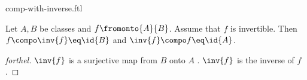\documentclass{stex}
\begin{document}
\begin{smodule}{comp-with-inverse.ftl}


\begin{proposition}[forthel,id=InvIsInvOfComp]
  Let $A, B$ be classes and $f \fromonto{A}{B}$.
  Assume that $f$ is invertible.
  Then $f \compo \inv{f} \eq \id{B}$ and $\inv{f} \compo f \eq \id{A}$.
\end{proposition}
\begin{proof}[forthel]
  $\inv{f}$ is a surjective map from $B$ onto $A$ .
  $\inv{f}$ is the inverse of $f$.
\end{proof}

\end{smodule}
\end{document}
